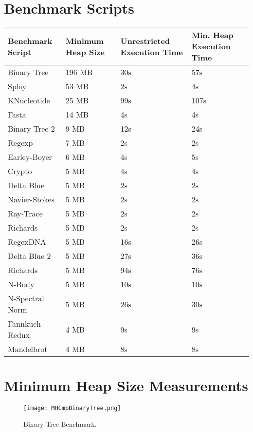 \documentclass{l4proj}
\begin{document}
\begin{appendices}
\chapter{Benchmark Scripts}
\label{benchmarks}
\begin{center}
\begin{tabular}{  | l | l | l | l | }
\hline  
Benchmark Script & Minimum Heap Size & Unrestricted Execution Time  & Min. Heap Execution Time\\
\hline
  Binary Tree & 196 MB & 30s & 57s \\
\hline
  Splay & 53 MB & 2s & 4s \\
\hline
  KNucleotide & 25 MB & 99s & 107s \\
\hline
  Fasta & 14 MB & 4s & 4s \\
\hline
  Binary Tree 2 & 9 MB & 12s & 24s\\
\hline
  Regexp & 7 MB & 2s & 2s \\
\hline  
  Earley-Boyer & 6 MB & 4s & 5s \\
\hline
  Crypto & 5 MB & 4s & 4s \\
\hline  
  Delta Blue & 5 MB & 2s & 2s \\
\hline  
  Navier-Stokes & 5 MB & 2s & 2s \\
\hline  
  Ray-Trace & 5 MB & 2s & 2s \\
\hline
  Richards & 5 MB & 2s & 2s \\
\hline
  RegexDNA & 5 MB& 16s & 26s \\
\hline
  Delta Blue 2 & 5 MB & 27s & 36s \\
\hline
  Richards & 5 MB & 94s & 76s \\
\hline
  N-Body & 5 MB & 10s & 10s \\
\hline
  N-Spectral Norm & 5 MB & 26s & 30s \\
\hline
  Fannkuch-Redux & 4 MB & 9s & 9s \\
\hline
  Mandelbrot & 4 MB & 8s & 8s \\
\hline
\end{tabular}
\end{center}
\chapter{Minimum Heap Size Measurements}
\label{minheapsize}
\begin{figure}[!ht]
  \centering
    \texttt{[image: MHCmpBinaryTree.png]}
    \caption{Binary Tree Benchmark.}
\end{figure}


\end{appendices}
\end{document}
